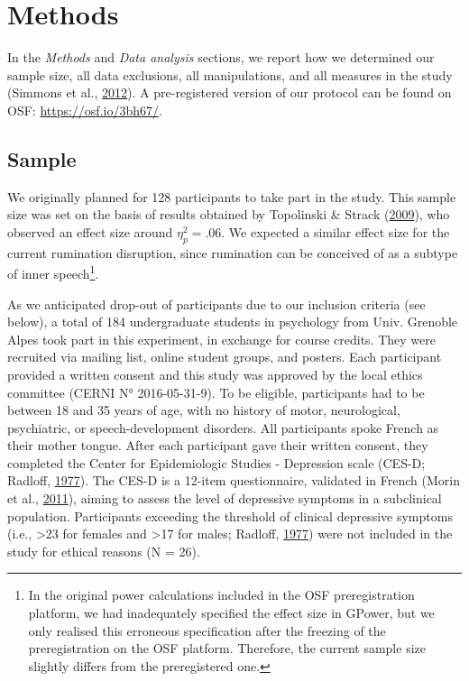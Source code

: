 \documentclass[a4paper,12pt,twoside,openright,oldfontcommands]{memoir}
\let\rmarkdownfootnote\footnote%
\def\footnote{\protect\rmarkdownfootnote}
\begin{document}
\hypertarget{methods-3}{%
\section{Methods}\label{methods-3}}

In the \emph{Methods} and \emph{Data analysis} sections, we report how we determined our sample size, all data exclusions, all manipulations, and all measures in the study (Simmons et al., \protect\hyperlink{ref-simmons_21_2012}{2012}). A pre-registered version of our protocol can be found on OSF: \url{https://osf.io/3bh67/}.

\hypertarget{sample}{%
\subsection{Sample}\label{sample}}

We originally planned for 128 participants to take part in the study. This sample size was set on the basis of results obtained by Topolinski \& Strack (\protect\hyperlink{ref-topolinski_motormouth_2009}{2009}), who observed an effect size around \(\eta_{p}^{2}=.06\). We expected a similar effect size for the current rumination disruption, since rumination can be conceived of as a subtype of inner speech\footnote{In the original power calculations included in the OSF preregistration platform, we had inadequately specified the effect size in GPower, but we only realised this erroneous specification after the freezing of the preregistration on the OSF platform. Therefore, the current sample size slightly differs from the preregistered one.}.

As we anticipated drop-out of participants due to our inclusion criteria (see below), a total of 184 undergraduate students in psychology from Univ. Grenoble Alpes took part in this experiment, in exchange for course credits. They were recruited via mailing list, online student groups, and posters. Each participant provided a written consent and this study was approved by the local ethics committee (CERNI N° 2016-05-31-9). To be eligible, participants had to be between 18 and 35 years of age, with no history of motor, neurological, psychiatric, or speech-development disorders. All participants spoke French as their mother tongue. After each participant gave their written consent, they completed the Center for Epidemiologic Studies - Depression scale (CES-D; Radloff, \protect\hyperlink{ref-radloff_ces-d_1977}{1977}). The CES-D is a 12-item questionnaire, validated in French (Morin et al., \protect\hyperlink{ref-morin_psychometric_2011}{2011}), aiming to assess the level of depressive symptoms in a subclinical population. Participants exceeding the threshold of clinical depressive symptoms (i.e., \textgreater23 for females and \textgreater17 for males; Radloff, \protect\hyperlink{ref-radloff_ces-d_1977}{1977}) were not included in the study for ethical reasons (N = 26).
\end{document}

